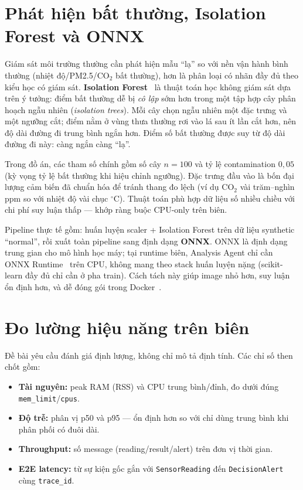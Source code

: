 \documentclass[12pt,a4paper,oneside]{report}
\newcommand{\code}[1]{\texttt{#1}}
\begin{document}
\section{Phát hiện bất thường, Isolation Forest và ONNX}

Giám sát môi trường thường cần phát hiện mẫu ``lạ'' so với nền vận hành bình thường (nhiệt độ/PM2.5/CO$_2$ bất thường), hơn là phân loại có nhãn đầy đủ theo kiểu học có giám sát. \textbf{Isolation Forest}~\cite{liu2008isolation} là thuật toán học không giám sát dựa trên ý tưởng: điểm bất thường dễ bị \textit{cô lập} sớm hơn trong một tập hợp cây phân hoạch ngẫu nhiên (\textit{isolation trees}). Mỗi cây chọn ngẫu nhiên một đặc trưng và một ngưỡng cắt; điểm nằm ở vùng thưa thường rơi vào lá sau ít lần cắt hơn, nên độ dài đường đi trung bình ngắn hơn. Điểm số bất thường được suy từ độ dài đường đi này: càng ngắn càng ``lạ''.

Trong đồ án, các tham số chính gồm số cây $n=100$ và tỷ lệ contamination $0{,}05$ (kỳ vọng tỷ lệ bất thường khi hiệu chỉnh ngưỡng). Đặc trưng đầu vào là bốn đại lượng cảm biến đã chuẩn hóa để tránh thang đo lệch (ví dụ CO$_2$ vài trăm--nghìn ppm so với nhiệt độ vài chục $^\circ$C). Thuật toán phù hợp dữ liệu số nhiều chiều với chi phí suy luận thấp --- khớp ràng buộc CPU-only trên biên.

Pipeline thực tế gồm: huấn luyện scaler + Isolation Forest trên dữ liệu synthetic ``normal'', rồi xuất toàn pipeline sang định dạng \textbf{ONNX}. ONNX là định dạng trung gian cho mô hình học máy; tại runtime biên, Analysis Agent chỉ cần ONNX Runtime~\cite{onnxruntime} trên CPU, không mang theo stack huấn luyện nặng (scikit-learn đầy đủ chỉ cần ở pha train). Cách tách này giúp image nhỏ hơn, suy luận ổn định hơn, và dễ đóng gói trong Docker~\cite{docker-compose}.

\section{Đo lường hiệu năng trên biên}

Đề bài yêu cầu đánh giá định lượng, không chỉ mô tả định tính. Các chỉ số then chốt gồm:
\begin{itemize}
  \item \textbf{Tài nguyên:} peak RAM (RSS) và CPU trung bình/đỉnh, đo dưới đúng \code{mem\_limit}/\code{cpus}.
  \item \textbf{Độ trễ:} phân vị p50 và p95 --- ổn định hơn so với chỉ dùng trung bình khi phân phối có đuôi dài.
  \item \textbf{Throughput:} số message (reading/result/alert) trên đơn vị thời gian.
  \item \textbf{E2E latency:} từ sự kiện gốc gắn với \code{SensorReading} đến \code{DecisionAlert} cùng \code{trace\_id}.
\end{itemize}
\end{document}
